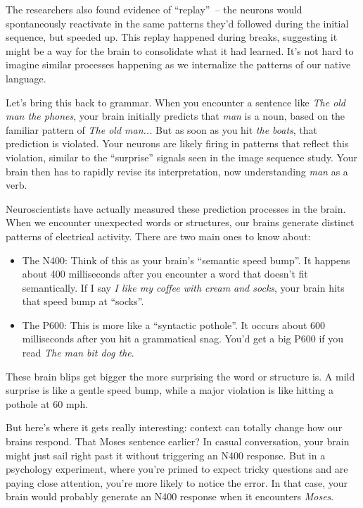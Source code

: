 The researchers also found evidence of ``replay''~-- the neurons would spontaneously reactivate in the same patterns they'd followed during the initial sequence, but speeded up. This replay happened during breaks, suggesting it might be a way for the brain to consolidate what it had learned. It's not hard to imagine similar processes happening as we internalize the patterns of our native language.

Let's bring this back to grammar. When you encounter a sentence like \textit{The old man the phones}, your brain initially predicts that \textit{man} is a noun, based on the familiar pattern of \textit{The old man...} But as soon as you hit \textit{the boats}, that prediction is violated. Your neurons are likely firing in patterns that reflect this violation, similar to the ``surprise'' signals seen in the image sequence study. Your brain then has to rapidly revise its interpretation, now understanding \textit{man} as a verb.

Neuroscientists have actually measured these prediction processes in the brain. When we encounter unexpected words or structures, our brains generate distinct patterns of electrical activity. There are two main ones to know about:

\begin{itemize}
    \item The N400: Think of this as your brain's ``semantic speed bump''. It happens about 400 milliseconds after you encounter a word that doesn't fit semantically. If I say \textit{I like my coffee with cream and socks}, your brain hits that speed bump at ``socks''.
    \item The P600: This is more like a ``syntactic pothole''. It occurs about 600 milliseconds after you hit a grammatical snag. You'd get a big P600 if you read \textit{The man bit dog the}.
\end{itemize}

These brain blips get bigger the more surprising the word or structure is. A mild surprise is like a gentle speed bump, while a major violation is like hitting a pothole at 60 mph.

But here's where it gets really interesting: context can totally change how our brains respond. That Moses sentence earlier? In casual conversation, your brain might just sail right past it without triggering an N400 response. But in a psychology experiment, where you're primed to expect tricky questions and are paying close attention, you're more likely to notice the error. In that case, your brain would probably generate an N400 response when it encounters \textit{Moses}.

